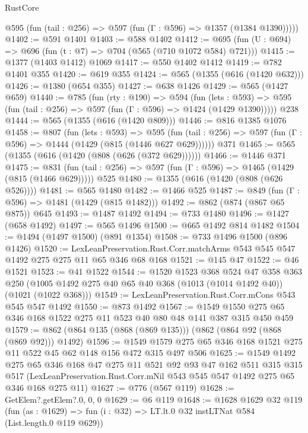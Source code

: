 \begin{lexlean}{RustCore}
\begin{coremodule}
{\begin{coremodule}
{{{{{{      @595 (fun (tail : @256) => @597 (fun (Γ : @596) => @1357 (@1384 @1390)))))
@1402 := @591 @1401
@1403 := @588 @1402
@1412 := @695 (fun (U : @694) => @696 (fun (t : @7) => @704 (@565 (@710 @1072 @584) @721)))
@1415 := @1377 (@1403 @1412) @1069
@1417 := @550 @1402 @1412
@1419 := @782 @1401 @355
@1420 := @619 @355
@1424 := @565 (@1355 (@616 (@1420 @632)))
@1426 := @1380 (@654 @355)
@1427 := @638 @1426
@1429 := @565 (@1427 @659)
@1440 := @785
    (fun (rty : @190) =>
    @594
      (fun (lets : @593) =>
      @595 (fun (tail : @256) => @597 (fun (Γ : @596) => @1424 (@1429 @1390)))))
    @238
@1444 := @565 (@1355 (@616 (@1420 @809)))
@1446 := @816 @1385 @1076
@1458 := @807
    (fun (lets : @593) =>
    @595 (fun (tail : @256) => @597 (fun (Γ : @596) => @1444 (@1429 (@815 (@1446 @627 @629))))))
    @371
@1465 := @565 (@1355 (@616 (@1420 (@808 (@626 (@372 @629))))))
@1466 := @1446 @371
@1475 := @831 (fun (tail : @256) => @597 (fun (Γ : @596) => @1465 (@1429 (@815 (@1466 @629))))) @525
@1480 := @1355 (@616 (@1420 (@808 (@626 @526))))
@1481 := @565 @1480
@1482 := @1466 @525
@1487 := @849 (fun (Γ : @596) => @1481 (@1429 (@815 @1482)))
@1492 := @862 (@874 (@867 @65 @875)) @645
@1493 := @1487 @1492
@1494 := @733 @1480
@1496 := @1427 (@658 @1492)
@1497 := @565 @1496
@1500 := @665 @1492 @814 @1482
@1504 := @1494 (@1497 @1500) (@891 @1354)
@1508 := @733 @1496 @1500 (@896 @1426)
@1520 := LexLeanPreservation.Rust.Corr.matchArms
    @543
    @545
    @547
    @1492
    @275
    @275
    @11
    @65
    @346
    @68
    @168
@1521 := @145 @47
@1522 := @46 @1521
@1523 := @41 @1522
@1544 := @1520
    @1523
    @368
    @524
    @47
    @358
    @363
    @250
    (@1005 @1492 @275 @40 @65 @40 @368 (@1013 (@1014 @1492 @40)) (@1021 (@1022 @368)))
@1549 := LexLeanPreservation.Rust.Corr.mCons @543 @545 @547 @1492
@1550 := @873 @1492
@1567 := @1549 @1550 @275 @65 @346 @168 @1522 @275 @11 @523 @40 @80 @48 @141 @387 @315 @450 @459
@1579 := @862 (@864 @135 (@868 (@869 @135))) (@862 (@864 @92 (@868 (@869 @92))) @1492)
@1596 := @1549 @1579 @275 @65 @346 @168 @1521 @275 @11 @522 @45 @62 @148 @156 @472 @315 @497 @506
@1625 := @1549
    @1492
    @275
    @65
    @346
    @168
    @47
    @275
    @11
    @521
    @92
    @93
    @47
    @162
    @511
    @315
    @315
    @517
    (LexLeanPreservation.Rust.Corr.mNil @543 @545 @547 @1492 @275 @65 @346 @168 @275 @11)
@1627 := @776 (@567 @119)
@1628 := GetElem?.getElem?.{0, 0, 0}
@1629 := @6 @119
@1648 := @1628
    @1629
    @32
    @119
    (fun (as : @1629) => fun (i : @32) => LT.lt.{0} @32 instLTNat @584 (List.length.{0} @119 @629))
}}}}}}
\end{coremodule}}
\end{coremodule}
\end{lexlean}
